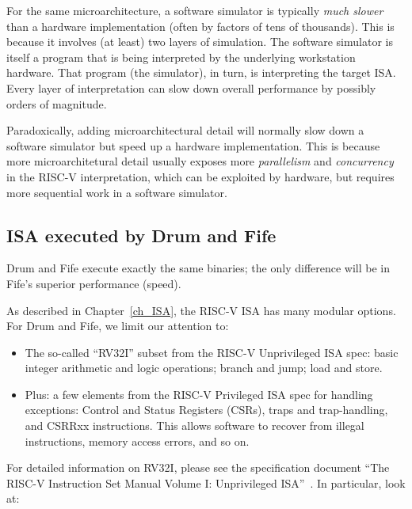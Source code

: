 For the same microarchitecture, a software simulator is typically
\emph{much slower} than a hardware implementation (often by factors of
tens of thousands).  This is because it involves (at least) two layers
of simulation. The software simulator is itself a program that is
being interpreted by the underlying workstation hardware.  That
program (the simulator), in turn, is interpreting the target ISA.
Every layer of interpretation can slow down overall performance by
possibly orders of magnitude.

Paradoxically, adding microarchitectural detail will normally slow
down a software simulator but speed up a hardware implementation.
This is because more microarchitetural detail usually exposes more
\emph{parallelism} and \emph{concurrency} in the RISC-V
interpretation, which can be exploited by hardware, but requires more
sequential work in a software simulator.


\subsection{ISA executed by Drum and Fife}

Drum and Fife execute exactly the same binaries; the only difference
will be in Fife's superior performance (speed).

As described in Chapter~\ref{ch_ISA}, the RISC-V ISA has many modular
options.  For Drum and Fife, we limit our attention to:

\begin{itemize}
		  
 \item The so-called ``RV32I'' subset from the RISC-V Unprivileged ISA
       spec: basic integer arithmetic and logic operations; branch and
       jump; load and store.

 \item Plus: a few elements from the RISC-V Privileged ISA spec for
       handling exceptions: Control and Status Registers (CSRs), traps
       and trap-handling, and CSRRxx instructions.  This allows
       software to recover from illegal instructions, memory access
       errors, and so on.

\end{itemize}

For detailed information on RV32I, please see the specification
document ``The RISC-V Instruction Set Manual Volume I: Unprivileged
ISA''~\cite{RISCV_Unpriv_2019_12_13}.  In particular, look at:

